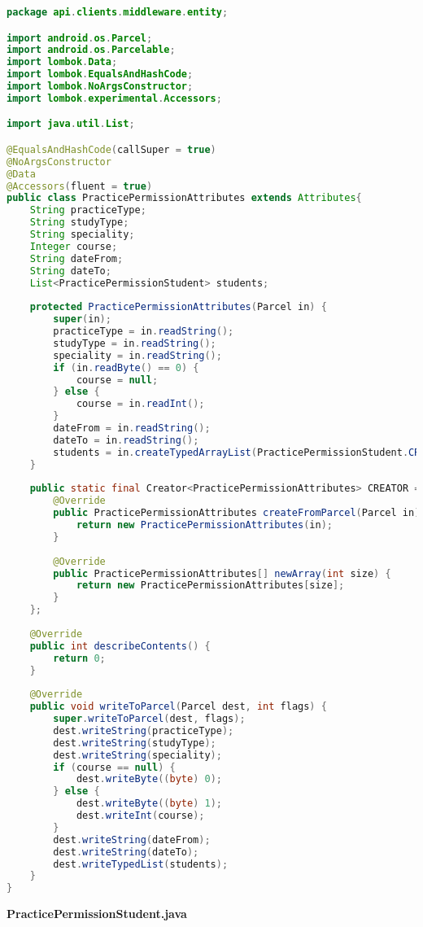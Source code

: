 \begin{lstlisting}[language=Java]
package api.clients.middleware.entity;

import android.os.Parcel;
import android.os.Parcelable;
import lombok.Data;
import lombok.EqualsAndHashCode;
import lombok.NoArgsConstructor;
import lombok.experimental.Accessors;

import java.util.List;

@EqualsAndHashCode(callSuper = true)
@NoArgsConstructor
@Data
@Accessors(fluent = true)
public class PracticePermissionAttributes extends Attributes{
	String practiceType;
	String studyType;
	String speciality;
	Integer course;
	String dateFrom;
	String dateTo;
	List<PracticePermissionStudent> students;
	
	protected PracticePermissionAttributes(Parcel in) {
		super(in);
		practiceType = in.readString();
		studyType = in.readString();
		speciality = in.readString();
		if (in.readByte() == 0) {
			course = null;
		} else {
			course = in.readInt();
		}
		dateFrom = in.readString();
		dateTo = in.readString();
		students = in.createTypedArrayList(PracticePermissionStudent.CREATOR);
	}
	
	public static final Creator<PracticePermissionAttributes> CREATOR = new Creator<PracticePermissionAttributes>() {
		@Override
		public PracticePermissionAttributes createFromParcel(Parcel in) {
			return new PracticePermissionAttributes(in);
		}
		
		@Override
		public PracticePermissionAttributes[] newArray(int size) {
			return new PracticePermissionAttributes[size];
		}
	};
	
	@Override
	public int describeContents() {
		return 0;
	}
	
	@Override
	public void writeToParcel(Parcel dest, int flags) {
		super.writeToParcel(dest, flags);
		dest.writeString(practiceType);
		dest.writeString(studyType);
		dest.writeString(speciality);
		if (course == null) {
			dest.writeByte((byte) 0);
		} else {
			dest.writeByte((byte) 1);
			dest.writeInt(course);
		}
		dest.writeString(dateFrom);
		dest.writeString(dateTo);
		dest.writeTypedList(students);
	}
}

\end{lstlisting}
\textbf{PracticePermissionStudent.java}
